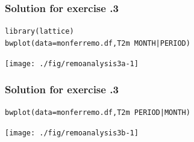 \documentclass[xcolor=table, xcolor=dvipsnames]{beamer}\usepackage[]{graphicx}\usepackage[]{color}
\makeatletter
\newcommand{\hlopt}[1]{\textcolor[rgb]{0,0,0}{#1}}
\newcommand{\hlstd}[1]{\textcolor[rgb]{0,0,0}{#1}}
\newcommand{\hlkwc}[1]{\textcolor[rgb]{1,0,1}{#1}}
\newcommand{\hlkwd}[1]{\textcolor[rgb]{0,0,1}{#1}}
\newenvironment{kframe}{%
 \def\at@end@of@kframe{}%
 \ifinner\ifhmode%
  \def\at@end@of@kframe{\end{minipage}}%
  \begin{minipage}{\columnwidth}%
 \fi\fi%
 \def\FrameCommand##1{\hskip\@totalleftmargin \hskip-\fboxsep
 \colorbox{shadecolor}{##1}\hskip-\fboxsep
     \hskip-\linewidth \hskip-\@totalleftmargin \hskip\columnwidth}%
 \MakeFramed {\advance\hsize-\width
   \@totalleftmargin\z@ \linewidth\hsize
   \@setminipage}}%
 {\par\unskip\endMakeFramed%
 \at@end@of@kframe}
\newenvironment{knitrout}{}{} %
\newcounter{exercisecount}
\makeatother
\begin{document}

\begin{frame}[fragile]\frametitle{Solution for exercise .3}
\begin{knitrout}
\color{fgcolor}\begin{kframe}
\begin{alltt}
\hlkwd{library}\hlstd{(lattice)}
\hlkwd{bwplot}\hlstd{(}\hlkwc{data}\hlstd{=monferremo.df, T2m} \hlopt{~} \hlstd{MONTH} \hlopt{|} \hlstd{PERIOD)}
\end{alltt}
\end{kframe}

{\centering \texttt{[image: ./fig/remoanalysis3a-1]} 

}



\end{knitrout}
\end{frame}


\begin{frame}[fragile]\frametitle{Solution for exercise .3}
\begin{knitrout}
\color{fgcolor}\begin{kframe}
\begin{alltt}
\hlkwd{bwplot}\hlstd{(}\hlkwc{data}\hlstd{=monferremo.df, T2m} \hlopt{~} \hlstd{PERIOD} \hlopt{|} \hlstd{MONTH)}
\end{alltt}
\end{kframe}

{\centering \texttt{[image: ./fig/remoanalysis3b-1]} 

}



\end{knitrout}
\end{frame}

% 
% 
\end{document}
